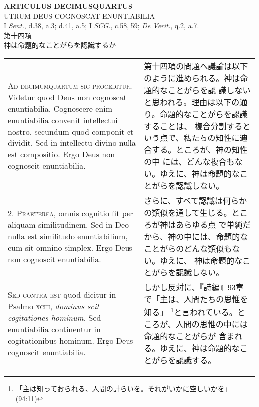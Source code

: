 \documentclass[10pt]{jsarticle} %
\begin{document}
\begin{center}
{\Large {\bf ARTICULUS DECIMUSQUARTUS}}\\ {\large UTRUM DEUS COGNOSCAT
ENUNTIABILIA}\\ {\footnotesize I {\itshape Sent.}, d.38, a.3; d.41,
a.5; I {\itshape SCG.}, c.58, 59; {\itshape De Verit.}, q.2,
a.7.}\\ {\Large 第十四項\\神は命題的なことがらを認識するか}
\end{center}

\begin{longtable}{p{21em}p{21em}}



{\huge A}{\scshape d decimumquartum sic proceditur}. Videtur quod Deus
non cognoscat enuntiabilia. Cognoscere enim enuntiabilia convenit
intellectui nostro, secundum quod componit et dividit. Sed in
intellectu divino nulla est compositio. Ergo Deus non cognoscit
enuntiabilia.


&

第十四項の問題へ議論は以下のように進められる。神は命題的なことがらを認
識しないと思われる。理由は以下の通り。命題的なことがらを認識することは、
複合分割するという点で、私たちの知性に適合する。ところが、神の知性の中
には、どんな複合もない。ゆえに、神は命題的なことがらを認識しない。

\\


{\scshape 2. Praeterea}, omnis cognitio fit per aliquam
similitudinem. Sed in Deo nulla est similitudo enuntiabilium, cum sit
omnino simplex. Ergo Deus non cognoscit enuntiabilia.


&

さらに、すべて認識は何らかの類似を通して生じる。ところが神はあらゆる点
で単純だから、神の中には、命題的なことがらのどんな類似もない。ゆえに、
神は命題的なことがらを認識しない。

\\


{\scshape Sed contra est} quod dicitur in Psalmo {\scshape xciii},
{\itshape dominus scit cogitationes hominum}. Sed enuntiabilia
continentur in cogitationibus hominum. Ergo Deus cognoscit
enuntiabilia.


&

しかし反対に、『詩編』93章で「主は、人間たちの思惟を知る」
\footnote{「主は知っておられる、人間の計らいを。それがいかに空しいかを」
(94:11)}と言われている。ところが、人間の思惟の中には命題的なことがらが
含まれる。ゆえに、神は命題的なことがらを認識する。


\end{longtable}
\end{document}
